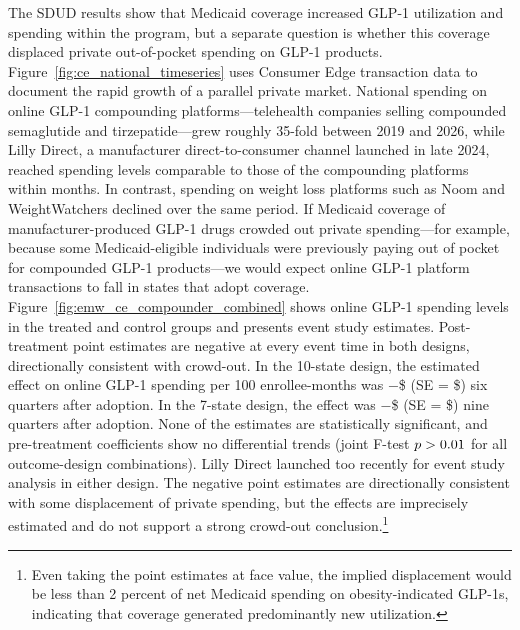 The SDUD results show that Medicaid coverage increased GLP-1 utilization and spending within the program, but a separate question is whether this coverage displaced private out-of-pocket spending on GLP-1 products. Figure~\ref{fig:ce_national_timeseries} uses Consumer Edge transaction data to document the rapid growth of a parallel private market. National spending on online GLP-1 compounding platforms---telehealth companies selling compounded semaglutide and tirzepatide---grew roughly 35-fold between 2019 and 2026, while Lilly Direct, a manufacturer direct-to-consumer channel launched in late 2024, reached spending levels comparable to those of the compounding platforms within months. In contrast, spending on weight loss platforms such as Noom and WeightWatchers declined over the same period. If Medicaid coverage of manufacturer-produced GLP-1 drugs crowded out private spending---for example, because some Medicaid-eligible individuals were previously paying out of pocket for compounded GLP-1 products---we would expect online GLP-1 platform transactions to fall in states that adopt coverage. Figure~\ref{fig:emw_ce_compounder_combined} shows online GLP-1 spending levels in the treated and control groups and presents event study estimates. Post-treatment point estimates are negative at every event time in both designs, directionally consistent with crowd-out. In the 10-state design, the estimated effect on online GLP-1 spending per 100 enrollee-months was $-$\$\ceCompTenSixEmw{} (SE = \$\ceCompTenSixEmwSE{}) six quarters after adoption. In the 7-state design, the effect was $-$\$\ceCompSevenNineEmw{} (SE = \$\ceCompSevenNineEmwSE{}) nine quarters after adoption. None of the estimates are statistically significant, and pre-treatment coefficients show no differential trends (joint F-test $p > 0.01{}$ for all outcome-design combinations). Lilly Direct launched too recently for event study analysis in either design. The negative point estimates are directionally consistent with some displacement of private spending, but the effects are imprecisely estimated and do not support a strong crowd-out conclusion.\footnote{Even taking the point estimates at face value, the implied displacement would be less than 2 percent of net Medicaid spending on obesity-indicated GLP-1s, indicating that coverage generated predominantly new utilization.}


